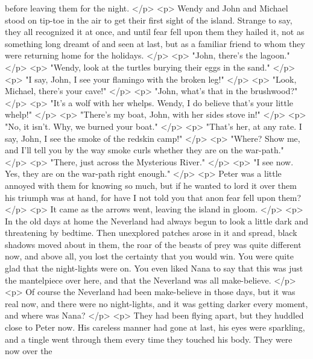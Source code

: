       before leaving them for the night.
    </p>
    <p>
      Wendy and John and Michael stood on tip-toe in the air to get their first
      sight of the island. Strange to say, they all recognized it at once, and
      until fear fell upon them they hailed it, not as something long dreamt of
      and seen at last, but as a familiar friend to whom they were returning
      home for the holidays.
    </p>
    <p>
      "John, there's the lagoon."
    </p>
    <p>
      "Wendy, look at the turtles burying their eggs in the sand."
    </p>
    <p>
      "I say, John, I see your flamingo with the broken leg!"
    </p>
    <p>
      "Look, Michael, there's your cave!"
    </p>
    <p>
      "John, what's that in the brushwood?"
    </p>
    <p>
      "It's a wolf with her whelps. Wendy, I do believe that's your little
      whelp!"
    </p>
    <p>
      "There's my boat, John, with her sides stove in!"
    </p>
    <p>
      "No, it isn't. Why, we burned your boat."
    </p>
    <p>
      "That's her, at any rate. I say, John, I see the smoke of the redskin
      camp!"
    </p>
    <p>
      "Where? Show me, and I'll tell you by the way smoke curls whether they are
      on the war-path."
    </p>
    <p>
      "There, just across the Mysterious River."
    </p>
    <p>
      "I see now. Yes, they are on the war-path right enough."
    </p>
    <p>
      Peter was a little annoyed with them for knowing so much, but if he wanted
      to lord it over them his triumph was at hand, for have I not told you that
      anon fear fell upon them?
    </p>
    <p>
      It came as the arrows went, leaving the island in gloom.
    </p>
    <p>
      In the old days at home the Neverland had always begun to look a little
      dark and threatening by bedtime. Then unexplored patches arose in it and
      spread, black shadows moved about in them, the roar of the beasts of prey
      was quite different now, and above all, you lost the certainty that you
      would win. You were quite glad that the night-lights were on. You even
      liked Nana to say that this was just the mantelpiece over here, and that
      the Neverland was all make-believe.
    </p>
    <p>
      Of course the Neverland had been make-believe in those days, but it was
      real now, and there were no night-lights, and it was getting darker every
      moment, and where was Nana?
    </p>
    <p>
      They had been flying apart, but they huddled close to Peter now. His
      careless manner had gone at last, his eyes were sparkling, and a tingle
      went through them every time they touched his body. They were now over the

